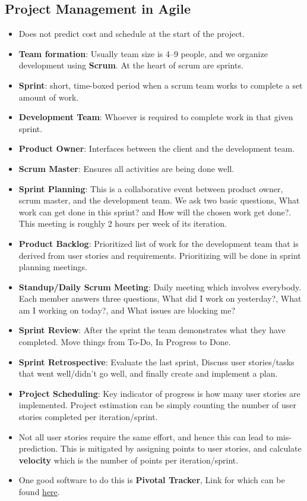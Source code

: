 \documentclass[a4paper]{article}
\begin{document}
\subsection{Project Management in Agile}
\begin{itemize}
    \item Does not predict cost and schedule at the start of the project.
    \item \textbf{Team formation}: Usually team size is 4–9 people, and we organize development using \textbf{Scrum}. At the heart of scrum are sprints.
    \item \textbf{Sprint}: short, time-boxed period when a scrum team works to complete a set amount of work.
    \item \textbf{Development Team}: Whoever is required to complete work in that given sprint.
    \item \textbf{Product Owner}: Interfaces between the client and the development team.
    \item \textbf{Scrum Master}: Ensures all activities are being done well.
    \item \textbf{Sprint Planning}: This is a collaborative event between product owner, scrum master, and the development team. We ask two basic questions, What work can get done in this sprint? and How will the chosen work get done?. This meeting is roughly 2 hours per week of its iteration.
    \item \textbf{Product Backlog}: Prioritized list of work for the development team that is derived from user stories and requirements. Prioritizing will be done in sprint planning meetings.
    \item \textbf{Standup/Daily Scrum Meeting}: Daily meeting which involves everybody. Each member answers three questions, What did I work on yesterday?, What am I working on today?, and What issues are blocking me?
    \item \textbf{Sprint Review}: After the sprint the team demonstrates what they have completed. Move things from To-Do, In Progress to Done.
    \item \textbf{Sprint Retrospective}: Evaluate the last sprint, Discuss user stories/tasks that went well/didn't go well, and finally create and implement a plan.
    \item \textbf{Project Scheduling}: Key indicator of progress is how many user stories are implemented. Project estimation can be simply counting the number of user stories completed per iteration/sprint.
    \item Not all user stories require the same effort, and hence this can lead to mis-prediction. This is mitigated by assigning points to user stories, and calculate \textbf{velocity} which is the number of points per iteration/sprint.
    \item One good software to do this is \textbf{Pivotal Tracker}, Link for which can be found \href{https://www.pivotaltracker.com/}{here}.
\end{itemize}
\end{document}
